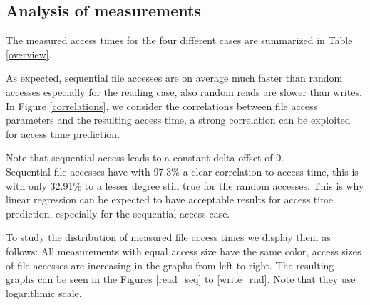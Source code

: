 \documentclass{superfri}
\begin{document}
	\subsection{Analysis of measurements}
	\label{sec:measurements}
	The measured access times for the four different cases are summarized in Table\,\ref{overview}.
	
	As expected, sequential file accesses are on average much faster than random accesses especially for the reading case, also random reads are slower than writes. In Figure \ref{correlations}, we consider the correlations between file access parameters and the resulting access time, a strong correlation can be exploited for access time prediction.
	
	Note that sequential access leads to a constant delta-offset of $0$.\\
	Sequential file accesses have with 97.3\% a clear correlation to access time, this is with only 32.91\% to a lesser degree still true for the random accesses.
	This is why linear regression can be expected to have acceptable results for access time prediction, especially for the sequential access case.
	
	
	\medskip
	
	To study the distribution of measured file access times we display them as follows:
	All measurements with equal access size have the same color, access sizes of file accesses are increasing in the graphs from left to right.
	The resulting graphs can be seen in the Figures \ref{read_seq} to \ref{write_rnd}. Note that they use logarithmic scale.
	
\end{document}
